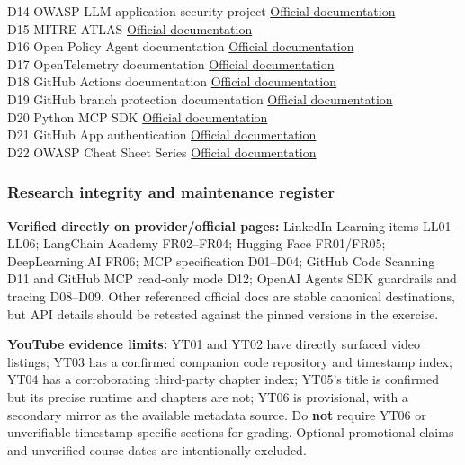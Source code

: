 \documentclass[
  10pt,
]{article}
\begin{document}
D14 \textbar{} OWASP LLM application security project \textbar{}
\href{https://genai.owasp.org/}{Official documentation} \textbar{}\\
D15 \textbar{} MITRE ATLAS \textbar{}
\href{https://atlas.mitre.org/}{Official documentation} \textbar{}\\
D16 \textbar{} Open Policy Agent documentation \textbar{}
\href{https://www.openpolicyagent.org/docs}{Official documentation}
\textbar{}\\
D17 \textbar{} OpenTelemetry documentation \textbar{}
\href{https://opentelemetry.io/docs/}{Official documentation}
\textbar{}\\
D18 \textbar{} GitHub Actions documentation \textbar{}
\href{https://docs.github.com/en/actions}{Official documentation}
\textbar{}\\
D19 \textbar{} GitHub branch protection documentation \textbar{}
\href{https://docs.github.com/en/repositories/configuring-branches-and-merges-in-your-repository/managing-protected-branches/about-protected-branches}{Official
documentation} \textbar{}\\
D20 \textbar{} Python MCP SDK \textbar{}
\href{https://github.com/modelcontextprotocol/python-sdk}{Official
documentation} \textbar{}\\
D21 \textbar{} GitHub App authentication \textbar{}
\href{https://docs.github.com/en/apps/creating-github-apps/authenticating-with-a-github-app}{Official
documentation} \textbar{}\\
D22 \textbar{} OWASP Cheat Sheet Series \textbar{}
\href{https://cheatsheetseries.owasp.org/}{Official documentation}
\textbar{}

\subsubsection{Research integrity and maintenance
register}\label{research-integrity-and-maintenance-register}

\textbf{Verified directly on provider/official pages:} LinkedIn Learning
items LL01--LL06; LangChain Academy FR02--FR04; Hugging Face FR01/FR05;
DeepLearning.AI FR06; MCP specification D01--D04; GitHub Code Scanning
D11 and GitHub MCP read-only mode D12; OpenAI Agents SDK guardrails and
tracing D08--D09. Other referenced official docs are stable canonical
destinations, but API details should be retested against the pinned
versions in the exercise.

\textbf{YouTube evidence limits:} YT01 and YT02 have directly surfaced
video listings; YT03 has a confirmed companion code repository and
timestamp index; YT04 has a corroborating third-party chapter index;
YT05's title is confirmed but its precise runtime and chapters are not;
YT06 is provisional, with a secondary mirror as the available metadata
source. Do \textbf{not} require YT06 or unverifiable timestamp-specific
sections for grading. Optional promotional claims and unverified course
dates are intentionally excluded.
\end{document}
